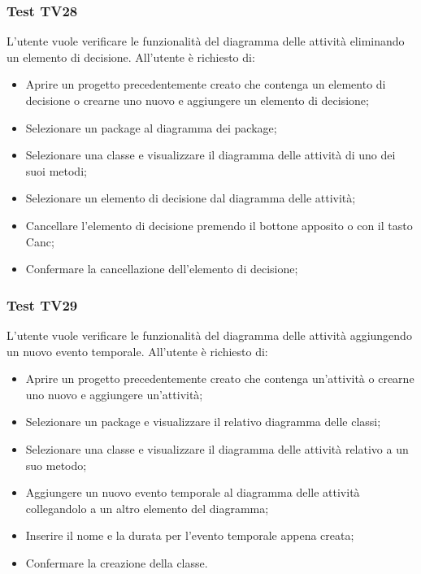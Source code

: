 \documentclass[../PianoDiQualifica.tex]{subfiles}
\begin{document}
	
	\subsubsection{Test TV28} 
	L'utente vuole verificare le funzionalità del diagramma delle attività eliminando un elemento di decisione. 
	All'utente è richiesto di: 
	\begin{itemize} 
		\item Aprire un progetto precedentemente creato che contenga un elemento di decisione o crearne uno nuovo e aggiungere un elemento di decisione;
		\item Selezionare un package al diagramma dei package; 
		\item Selezionare una classe e visualizzare il diagramma delle attività di uno dei suoi metodi; 
		\item Selezionare un elemento di decisione dal diagramma delle attività; 
		\item Cancellare l'elemento di decisione premendo il bottone apposito o con il tasto Canc; 
		\item Confermare la cancellazione dell'elemento di decisione;%
	\end{itemize} 	
	
	\subsubsection{Test TV29} 
	L'utente vuole verificare le funzionalità del diagramma delle attività aggiungendo un nuovo evento temporale. 
	All'utente è richiesto di: 
	\begin{itemize} 
		\item Aprire un progetto precedentemente creato che contenga un'attività o crearne uno nuovo e aggiungere un'attività;
		\item Selezionare un package e visualizzare il relativo diagramma delle classi; 
		\item Selezionare una classe e visualizzare il diagramma delle attività relativo a un suo metodo; %
		\item Aggiungere un nuovo evento temporale al diagramma delle attività collegandolo a un altro elemento del diagramma; 
		\item Inserire il nome e la durata per l'evento temporale appena creata; %
		\item Confermare la creazione della classe. 
	\end{itemize} 
	
\end{document}
